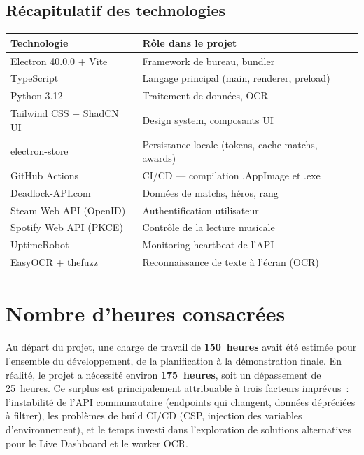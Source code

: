\documentclass[12pt,a4paper]{article}
\begin{document}
\subsection{Récapitulatif des technologies}

\begin{center}
\begin{tabular}{ll}
\toprule
\textbf{Technologie} & \textbf{Rôle dans le projet} \\
\midrule
Electron 40.0.0 + Vite & Framework de bureau, bundler \\
TypeScript & Langage principal (main, renderer, preload) \\
Python 3.12 & Traitement de données, OCR \\
Tailwind CSS + ShadCN UI & Design system, composants UI \\
electron-store & Persistance locale (tokens, cache matchs, awards) \\
GitHub Actions & CI/CD --- compilation .AppImage et .exe \\
Deadlock-API.com & Données de matchs, héros, rang \\
Steam Web API (OpenID) & Authentification utilisateur \\
Spotify Web API (PKCE) & Contrôle de la lecture musicale \\
UptimeRobot & Monitoring heartbeat de l'API \\
EasyOCR + thefuzz & Reconnaissance de texte à l'écran (OCR) \\
\bottomrule
\end{tabular}
\end{center}

\section{Nombre d'heures consacrées}

Au départ du projet, une charge de travail de \textbf{150~heures} avait
été estimée pour l'ensemble du développement, de la planification à la
démonstration finale. En réalité, le projet a nécessité environ
\textbf{175~heures}, soit un dépassement de 25~heures. Ce surplus est
principalement attribuable à trois facteurs imprévus~: l'instabilité de
l'API communautaire (endpoints qui changent, données dépréciées à
filtrer), les problèmes de build CI/CD (CSP, injection des variables
d'environnement), et le temps investi dans l'exploration de solutions
alternatives pour le Live Dashboard et le worker OCR.
\end{document}
